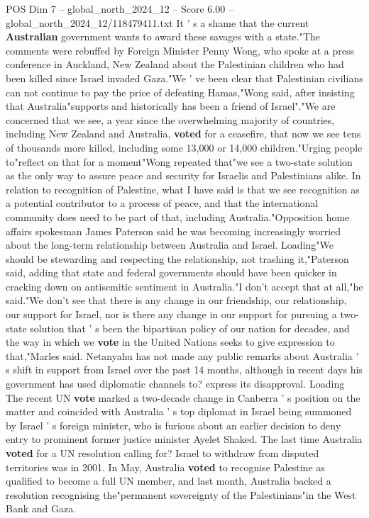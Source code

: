 \begin{textsample}{POS Dim 7 – global\_north\_2024\_12 – Score 6.00 – global\_north\_2024\_12/118479411.txt}
It ' s a shame that the current \textbf{Australian} government wants to award these savages with a state."The comments were rebuffed by Foreign Minister Penny Wong, who spoke at a press conference in Auckland, New Zealand about the Palestinian children who had been killed since Israel invaded Gaza."We ' ve been clear that Palestinian civilians can not continue to pay the price of defeating Hamas,"Wong said, after insisting that Australia"supports and historically has been a friend of Israel"."We are concerned that we see, a year since the overwhelming majority of countries, including New Zealand and Australia, \textbf{voted} for a ceasefire, that now we see tens of thousands more killed, including some 13,000 or 14,000 children."Urging people to"reflect on that for a moment"Wong repeated that"we see a two-state solution as the only way to assure peace and security for Israelis and Palestinians alike.
In relation to recognition of Palestine, what I have said is that we see recognition as a potential contributor to a process of peace, and that the international community does need to be part of that, including Australia."Opposition home affairs spokesman James Paterson said he was becoming increasingly worried about the long-term relationship between Australia and Israel.
Loading"We should be stewarding and respecting the relationship, not trashing it,"Paterson said, adding that state and federal governments should have been quicker in cracking down on antisemitic sentiment in Australia."I don't accept that at all,"he said."We don't see that there is any change in our friendship, our relationship, our support for Israel, nor is there any change in our support for pursuing a two-state solution that ' s been the bipartisan policy of our nation for decades, and the way in which we \textbf{vote} in the United Nations seeks to give expression to that,"Marles said.
Netanyahu has not made any public remarks about Australia ' s shift in support from Israel over the past 14 months, although in recent days his government has used diplomatic channels to? express its disapproval.
Loading The recent UN \textbf{vote} marked a two-decade change in Canberra ' s position on the matter and coincided with Australia ' s top diplomat in Israel being summoned by Israel ' s foreign minister, who is furious about an earlier decision to deny entry to prominent former justice minister Ayelet Shaked.
The last time Australia \textbf{voted} for a UN resolution calling for?
Israel to withdraw from disputed territories was in 2001.
In May, Australia \textbf{voted} to recognise Palestine as qualified to become a full UN member, and last month, Australia backed a resolution recognising the"permanent sovereignty of the Palestinians"in the West Bank and Gaza.

\end{textsample}
